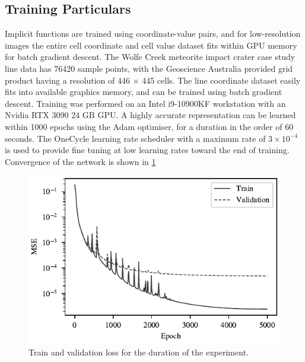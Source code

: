 \documentclass[manuscript.tex]{subfiles}
\begin{document}

\subsection{Training Particulars}
\label{sec:training}

Implicit functions are trained using coordinate-value pairs, and for low-resolution images the entire cell coordinate and cell value dataset fits within GPU memory for batch gradient descent.
The Wolfe Creek meteorite impact crater case study line data has \SI{76420}{} sample points, with the Geoscience Australia provided grid product having a resolution of 446 \(\times{}\) 445 cells.
The line coordinate dataset easily fits into available graphics memory, and can be trained using batch gradient descent.
Training was performed on an Intel i9-10900KF workstation with an Nvidia RTX 3090 24 GB GPU\@.
A highly accurate representation can be learned within 1000 epochs using the Adam optimiser, for a duration in the order of 60 seconds.
The OneCycle learning rate scheduler \parencite{smithSuperconvergenceVeryFast2018} with a maximum rate of \(3\times{}10^{-4}\) is used to provide fine tuning at low learning rates toward the end of training.
Convergence of the network is shown in \cref{fig:convergence}

\begin{figure}[hbt]
    \centering{}
    \includegraphics[width=0.5\linewidth]{fig/p3/loss_plot.pdf}
    \caption[Training convergence]{Train and validation loss for the duration of the experiment.}
    \label{fig:convergence}
\end{figure}
\end{document}
